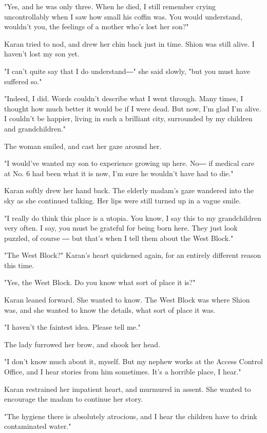 "Yes, and he was only three. When he died, I still remember crying
uncontrollably when I saw how small his coffin was. You would
understand, wouldn't you, the feelings of a mother who's lost her son?"

Karan tried to nod, and drew her chin back just in time. Shion was still
alive. I haven't lost my son yet.

"I can't quite say that I do understand―" she said slowly, "but you must
have suffered so."

"Indeed, I did. Words couldn't describe what I went through. Many times,
I thought how much better it would be if I were dead. But now, I'm glad
I'm alive. I couldn't be happier, living in such a brilliant city,
surrounded by my children and grandchildren."

The woman smiled, and cast her gaze around her.

"I would've wanted my son to experience growing up here. No― if medical
care at No. 6 had been what it is now, I'm sure he wouldn't have had to
die."

Karan softly drew her hand back. The elderly madam's gaze wandered into
the sky as she continued talking. Her lips were still turned up in a
vague smile.

"I really do think this place is a utopia. You know, I say this to my
grandchildren very often. I say, you must be grateful for being born
here. They just look puzzled, of course ― but that's when I tell them
about the West Block."

"The West Block?" Karan's heart quickened again, for an entirely
different reason this time.

"Yes, the West Block. Do you know what sort of place it is?"

Karan leaned forward. She wanted to know. The West Block was where Shion
was, and she wanted to know the details, what sort of place it was.

"I haven't the faintest idea. Please tell me."

The lady furrowed her brow, and shook her head.

"I don't know much about it, myself. But my nephew works at the Access
Control Office, and I hear stories from him sometimes. It's a horrible
place, I hear."

Karan restrained her impatient heart, and murmured in assent. She wanted
to encourage the madam to continue her story.

"The hygiene there is absolutely atrocious, and I hear the children have
to drink contaminated water."

